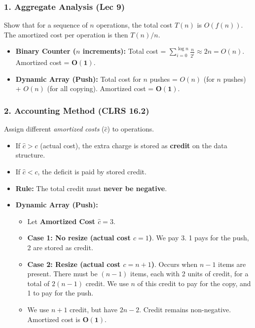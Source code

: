\subsubsection{1. Aggregate Analysis (Lec 9)}
Show that for a sequence of $n$ operations, the total cost $T(n)$ is $O(f(n))$. The amortized cost per operation is then $T(n)/n$.
\begin{itemize}
    \item \textbf{Binary Counter ($n$ increments):} Total cost = $\sum_{i=0}^{\log n} \frac{n}{2^i} \approx 2n = O(n)$. Amortized cost = $\mathbf{O(1)}$.
    \item \textbf{Dynamic Array (Push):} Total cost for $n$ pushes = $O(n)$ (for $n$ pushes) + $O(n)$ (for all copying). Amortized cost = $\mathbf{O(1)}$.
\end{itemize}

\subsubsection{2. Accounting Method (CLRS 16.2)}
Assign different \textit{amortized costs} ($\hat{c}$) to operations.
\begin{itemize}
    \item If $\hat{c} > c$ (actual cost), the extra charge is stored as \textbf{credit} on the data structure.
    \item If $\hat{c} < c$, the deficit is paid by stored credit.
    \item \textbf{Rule:} The total credit must \textbf{never be negative}.
    \item \textbf{Dynamic Array (Push):}
    \begin{itemize}
        \item Let \textbf{Amortized Cost $\hat{c} = 3$}.
        \item \textbf{Case 1: No resize (actual cost $c=1$)}. We pay 3. 1 pays for the push, 2 are stored as credit.
        \item \textbf{Case 2: Resize (actual cost $c=n+1$)}. Occurs when $n-1$ items are present. There must be $(n-1)$ items, each with 2 units of credit, for a total of $2(n-1)$ credit. We use $n$ of this credit to pay for the copy, and 1 to pay for the push.
        \item We use $n+1$ credit, but have $2n-2$. Credit remains non-negative. Amortized cost is $\mathbf{O(1)}$.
    \end{itemize}
\end{itemize}

